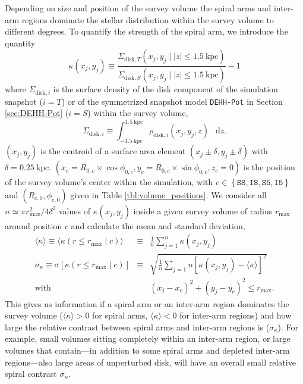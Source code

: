 \documentclass[iop,revtex4,numberedappendix,appendixfloats]{emulateapj}
\newcommand*\diff{\mathop{}\!\mathrm{d}}
\begin{document}
Depending on size and position of the survey volume the spiral arms and inter-arm regions dominate the stellar distribution within the survey volume to different degrees. To quantify the strength of the spiral arm, we introduce the quantity
\begin{equation}
\kappa(x_j,y_j) \equiv \frac{\Sigma_{\text{disk},T}(x_j,y_j \mid |z|\leq 1.5~\text{kpc})}{\Sigma_{\text{disk},S}(x_j,y_j \mid |z| \leq1.5~\text{kpc})} -1\label{eq:kappa_definition}
\end{equation}
where $\Sigma_{\text{disk},i}$ is the surface density of the disk component  of the simulation snapshot ($i=T$) or of the symmetrized snapshot model \texttt{DEHH-Pot} in Section \ref{sec:DEHH-Pot} ($i=S$) within the survey volume,
\begin{equation}
\Sigma_{\text{disk},i} \equiv \int_{-1.5~\text{kpc}}^{1.5~\text{kpc}} \rho_{\text{disk},i}(x_j,y_j,z) \ \diff z.
\end{equation}
$(x_j,y_j)$ is the centroid of a surface area element $(x_j\pm\delta,y_j\pm \delta)$ with $\delta=0.25~\text{kpc}$. $(x_c=R_{0,c}\times\cos \phi_{0,c},y_c=R_{0,c}\times\sin \phi_{0,c},z_c=0)$ is the position of the survey volume's center within the simulation, with $c\in\left\{ \texttt{S8},\texttt{I8},\texttt{S5},\texttt{I5}\right\}$ and $(R_{c,0},\phi_{c,0})$ given in Table \ref{tbl:volume_positions}. We consider all $n \simeq \pi r_\text{max}^2/4\delta^2$ values of $\kappa(x_j,y_j)$ inside a given survey volume of radius $r_\text{max}$ around position $c$ and calculate the mean and standard deviation,
\begin{eqnarray}
\langle \kappa \rangle \equiv \langle \kappa (r \leq r_\text{max} \mid c) \rangle &\equiv & \frac 1n \sum_{j=1}^n \kappa(x_j,y_j)\label{eq:mean_kappa}\\
\sigma_\kappa \equiv \sigma[\kappa(r \leq r_\text{max} \mid c)]  &\equiv &  \sqrt{\frac 1n \sum_{j=1}{n} \left[ \kappa(x_j,y_j) -  \langle \kappa \rangle \right]^2}\label{eq:std_kappa}\\
 \text{with } && (x_j-x_c)^2 + (y_j-y_c)^2 \leq r_\text{max}. \nonumber
\end{eqnarray}
This gives us information if a spiral arm or an inter-arm region dominates the survey volume ($\langle \kappa \rangle > 0$ for spiral arms, $\langle \kappa \rangle < 0$ for inter-arm regions) and how large the relative contrast between spiral arms and inter-arm regions is ($\sigma_\kappa$). For example, small volumes sitting completely within an inter-arm region, or large volumes that contain---in addition to some spiral arms and depleted inter-arm regions---also large areas of unperturbed disk, will have an overall small relative spiral contrast $\sigma_\kappa$.
\end{document}
